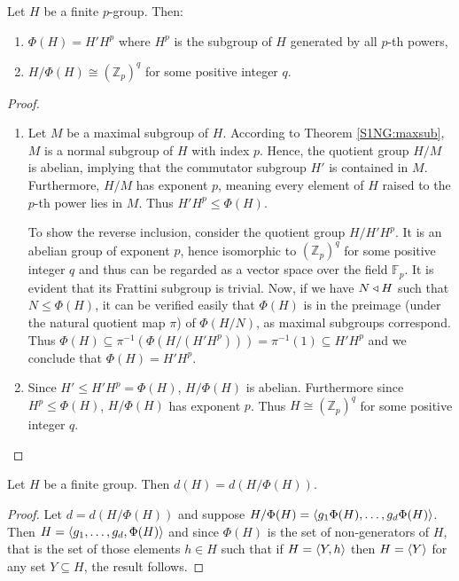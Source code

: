 \begin{theorem}
    \cite[p.~127]{RotmanITG}
    \label{fratpgroup}
    Let $H$ be a finite $p$-group. Then:
    \begin{enumerate}
        \item $\Phi(H) = H'H^p$ where $H^p$ is the subgroup of $H$ generated by all $p$-th powers,
        \item $H/\Phi(H) \cong (\mathbb{Z}_p)^q$ for some positive integer $q$.
    \end{enumerate}
\end{theorem}

\begin{proof}
    \begin{enumerate}
        \item Let $M$ be a maximal subgroup of $H$. According to Theorem \ref{S1NG:maxsub}, $M$ is a normal subgroup of $H$ with index $p$. 
        Hence, the quotient group $H/M$ is abelian, implying that the commutator subgroup $H'$ is contained in $M$. 
        Furthermore, $H/M$ has exponent $p$, meaning every element of $H$ raised to the $p$-th power lies in $M$. 
        Thus $H'H^p \le \Phi(H)$.

        To show the reverse inclusion, consider the quotient group $H/H'H^p$.
        It is an abelian group of exponent $p$, hence isomorphic to $(\mathbb{Z}_p)^q$ for some positive integer $q$ and thus can be regarded as a vector space over the field $\mathbb{F}_p$.
        It is evident that its Frattini subgroup is trivial.
        Now, if we have $N \triangleleft H$ such that $N \le \Phi(H)$, it can be verified easily that $\Phi(H)$ is in the preimage (under the natural quotient map $\pi$) of $\Phi(H/N)$, as maximal subgroups correspond.
        Thus $\Phi(H) \subseteq \pi^{-1}(\Phi(H/(H'H^p))) = \pi^{-1}(1) \subseteq H'H^p$ and we conclude that $\Phi(H) = H'H^p$.

        \item Since $H' \le H'H^p = \Phi(H)$, $H/\Phi(H)$ is abelian. Furthermore since $H^p \le \Phi(H)$, $H/\Phi(H)$ has exponent $p$.
        Thus $H \cong (\mathbb{Z}_p)^q$ for some positive integer $q$.

    \end{enumerate}
\end{proof}

\begin{theorem}
\label{th:fratgen}
Let $H$ be a finite group. Then $d(H) = d(H/\Phi(H))$.
\end{theorem}
\begin{proof}
    Let $d = d(H/\Phi(H))$ and suppose $H/\Phi(H) = \langle g_1\Phi(H),\ldots ,g_d\Phi(H) \rangle$. 
    Then $H = \langle g_1,\ldots ,g_d,\Phi(H) \rangle$ and since $\Phi(H)$ is the set of non-generators of $H$, that is the set of those elements $h \in H$ such that if $H = \langle Y, h \rangle$ then $H = \langle Y \rangle$ for any set $Y \subseteq H$, the result follows.
\end{proof}
